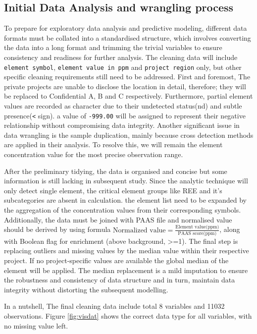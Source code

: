 \documentclass[11pt,a4paper,]{article}
\begin{document}
\subsection{Initial Data Analysis and wrangling process}\label{initial-data-analysis-and-wrangling-process}

To prepare for exploratory data analysis and predictive modeling, different data formats must be collated into a standardised structure, which involves converting the data into a long format and trimming the trivial variables to ensure consistency and readiness for further analysis. The cleaning data will include \texttt{element\ symbol}, \texttt{element\ value\ in\ ppm} and \texttt{project\ region} only, but other specific cleaning requirements still need to be addressed. First and foremost, The private projects are unable to disclose the location in detail, therefore; they will be replaced to Confidential A, B and C respectively. Furthermore, partial element values are recorded as character due to their undetected status(nd) and subtle presence(\texttt{\textless{}} sign). a value of \texttt{-999.00} will be assigned to represent their negative relationship without compromising data integrity. Another significant issue in data wrangling is the sample duplication, mainly because cross detection methods are applied in their analysis. To resolve this, we will remain the element concentration value for the most precise observation range.

After the preliminary tidying, the data is organised and concise but some information is still lacking in subsequent study. Since the analytic technique will only detect single element, the critical element groups like REE and it's subcategories are absent in calculation. the element list need to be expanded by the aggregation of the concentration values from their corresponding symbols. Additionally, the data must be joined with PAAS file and normalised value should be derived by using formula \(\text{Normalized value}= \frac{\text{Element value(ppm)}}{\text{PAAS score(ppm)}}\), along with Boolean flag for enrichment (above background, \textgreater=1). The final step is replacing outliers and missing values by the median value within their respective project. If no project-specific values are available the global median of the element will be applied. The median replacement is a mild imputation to ensure the robustness and consistency of data structure and in turn, maintain data integrity without distorting the subsequent modelling.

In a nutshell, The final cleaning data include total 8 variables and 11032 observations. Figure \ref{fig:visdat} shows the correct data type for all variables, with no missing value left.
\end{document}
